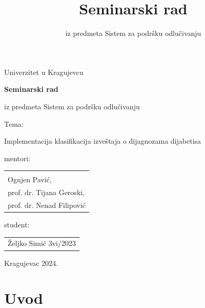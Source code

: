 \documentclass[fontsize=12bp, paper=a4]{scrarticle}
\title{Seminarski rad}
\subtitle{iz predmeta Sistem za podršku odlučivanju}
\begin{document}
\begin{titlepage}
    
    \begin{center}
        
        \vspace*{8cm}
        
        \large{Univerzitet u Kragujevcu}
        
        \vspace*{1cm}

        {\bfseries \LARGE Seminarski rad}
        
        \large{iz predmeta Sistem za podršku odlučivanju}
        
        \vspace*{1cm}
        \large{Tema:}

        \Large{Implementacija klasifikacija izveštaja o dijagnozama dijabetisa}


        \vspace*{2cm}
    \end{center}
    \hfill{\parbox[s]{8cm}{

    mentori: 
    \begin{tabular}{l}
        \\
        \\
        Ognjen Pavić, \\
        prof. dr. Tijana Geroski, \\
        prof. dr. Nenad Filipović 
    \end{tabular}
    
    student: \begin{tabular}{l}
        Željko Simić 3vi/2023
    \end{tabular}
    }}

    \hspace*{\fill} 

    \vspace*{2cm}

    \begin{center}
        Kragujevac 2024.
    \end{center}
\end{titlepage}


\setcounter{page}{1}
\justifying
\linespread{0.9}
\cfoot[\pagemark]{\pagemark}
\ofoot[]{}
\chead[]{}
%
\justifying

\section{Uvod}
    
\end{document}

